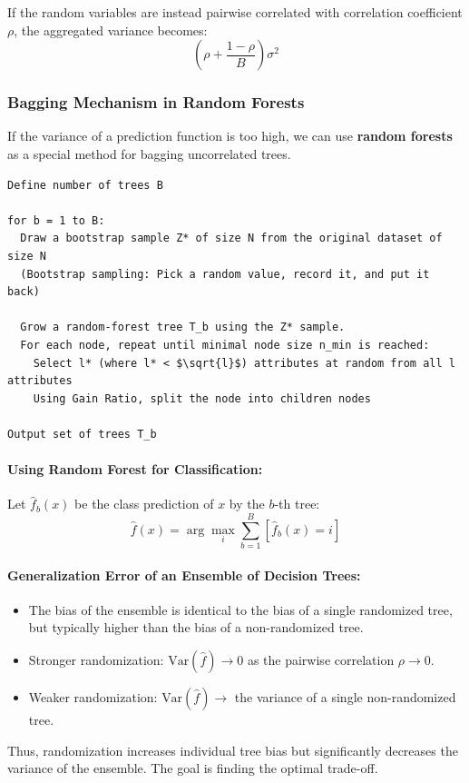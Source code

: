\documentclass{article}
\begin{document}
If the random variables are instead pairwise correlated with correlation coefficient $\rho$, the aggregated variance becomes:
\[ \left(\rho + \frac{1 - \rho}{B}\right)\sigma^2 \]

\subsubsection{Bagging Mechanism in Random Forests}
If the variance of a prediction function is too high, we can use \textbf{random forests} as a special method for bagging uncorrelated trees.

\begin{lstlisting}[mathescape=true]
Define number of trees B

for b = 1 to B:
  Draw a bootstrap sample Z* of size N from the original dataset of size N
  (Bootstrap sampling: Pick a random value, record it, and put it back)

  Grow a random-forest tree T_b using the Z* sample.
  For each node, repeat until minimal node size n_min is reached:
    Select l* (where l* < $\sqrt{l}$) attributes at random from all l attributes
    Using Gain Ratio, split the node into children nodes

Output set of trees T_b
\end{lstlisting}

\paragraph{Using Random Forest for Classification:} Let $\hat{f}_b(x)$ be the class prediction of $x$ by the $b$-th tree:
\[ \hat{f}(x) = \arg\max_i \sum_{b=1}^B \left[\hat{f}_b(x) = i\right] \]

\paragraph{Generalization Error of an Ensemble of Decision Trees:} 
\begin{itemize}
  \item The bias of the ensemble is identical to the bias of a single randomized tree, but typically higher than the bias of a non-randomized tree.
  \item Stronger randomization: $\text{Var}(\hat{f}) \to 0$ as the pairwise correlation $\rho \to 0$.
  \item Weaker randomization: $\text{Var}(\hat{f}) \to$ the variance of a single non-randomized tree.
\end{itemize}
Thus, randomization increases individual tree bias but significantly decreases the variance of the ensemble. The goal is finding the optimal trade-off.
\end{document}
